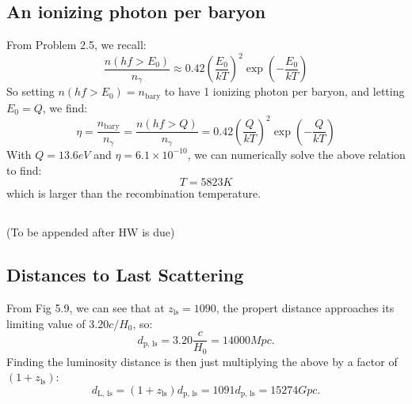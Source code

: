 \subsection{An ionizing photon per baryon}
From Problem 2.5, we recall:
\begin{equation}
    \frac{n(hf > E_0)}{n_\gamma} \approx 0.42\left(\frac{E_0}{kT}\right)^2\exp(-\frac{E_0}{kT})
\end{equation}
So setting $n(hf > E_0) = n_{\text{bary}}$ to have 1 ionizing photon per baryon, and letting $E_0 = Q$, we find:
\begin{equation}
    \eta = \frac{n_{\text{bary}}}{n_{\gamma}} = \frac{n(hf > Q)}{n_\gamma} = 0.42\left(\frac{Q}{kT}\right)^2\exp(-\frac{Q}{kT})
\end{equation}
With $Q = 13.6\si{eV}$ and $\eta = 6.1 \times 10^{-10}$, we can numerically solve the above relation to find:
\begin{equation}
    \boxed{T = 5823\si{K}}
\end{equation}
which is larger than the recombination temperature.

\subsection{}
(To be appended after HW is due)

\subsection{Distances to Last Scattering}
From Fig 5.9, we can see that at $z_{\text{ls}} = 1090$, the propert distance approaches its limiting value of $3.20c/H_0$, so:
\begin{equation}
    \boxed{d_{\text{p, ls}} = 3.20\frac{c}{H_0} = 14000\si{Mpc}}.
\end{equation}
Finding the luminosity distance is then just multiplying the above by a factor of $(1 + z_{\text{ls}})$:
\begin{equation}
    \boxed{d_{\text{L, ls}} = (1 + z_{\text{ls}})d_{\text{p, ls}} = 1091d_{\text{p, ls}} = 15274\si{Gpc}}.
\end{equation}
